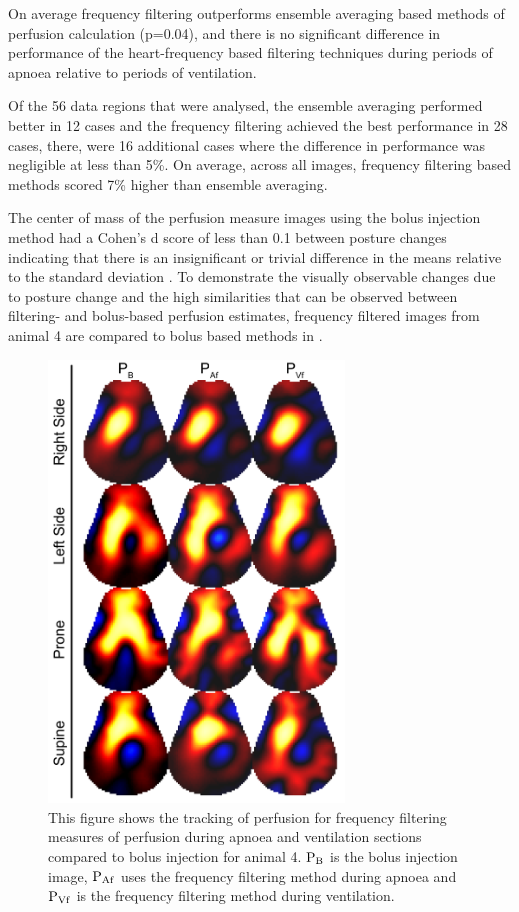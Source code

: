 On average frequency filtering outperforms ensemble averaging based methods
of perfusion calculation (p=0.04), and there is no significant difference in
performance of the heart-frequency based 
filtering techniques during periods of apnoea relative to periods of ventilation.

Of the 56 data regions that were analysed,
the ensemble averaging performed better in 12 cases and the frequency 
filtering achieved the best performance in 28 cases, there, were 16 additional cases 
where the difference in performance was negligible at less than 5\%. On 
average, across all images, frequency filtering based methods scored
7\% higher than ensemble averaging.

The center of mass of the perfusion 
measure images using the bolus injection method had a Cohen's d score of less than 0.1 
between posture changes
indicating that there is an insignificant or trivial difference in the means relative
to the standard deviation \parencite{cohen_statistical_1977}. 
To demonstrate the visually observable changes due to posture change and the 
high similarities that can be observed between filtering- and bolus-based 
perfusion estimates, frequency filtered images from 
animal 4 are compared to bolus based methods in .

\begin{figure}
\centering
\includegraphics[width=0.7\textwidth]{chapter3-perfusion_analysis/imgs/fig-discussionSample.pdf}
\caption[Example perfusion images]{\label{fig:discussionSample}%
		This figure shows the tracking of perfusion for frequency filtering measures
		of perfusion during apnoea and ventilation sections compared to bolus injection
		for animal 4.
${\rm P_{B}}$ is the bolus injection image, 
${\rm P_{Af}}$ uses the frequency filtering method during apnoea and
${\rm P_{Vf}}$ is the frequency filtering method during ventilation.
}
\end{figure}


